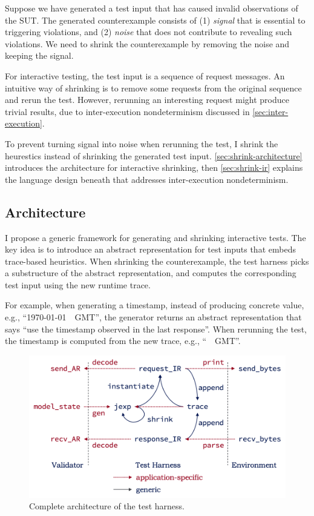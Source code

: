 Suppose we have generated a test input that has caused invalid observations of
the SUT.  The generated counterexample consists of (1) {\em signal} that is
essential to triggering violations, and (2) {\em noise} that does not contribute
to revealing such violations.  We need to shrink the counterexample by removing
the noise and keeping the signal.

For interactive testing, the test input is a sequence of request messages.  An
intuitive way of shrinking is to remove some requests from the original sequence
and rerun the test.  However, rerunning an interesting request might produce
trivial results, due to inter-execution nondeterminism discussed in
\autoref{sec:inter-execution}.

To prevent turning signal into noise when rerunning the test, I shrink the
heurestics instead of shrinking the generated test input.
\autoref{sec:shrink-architecture} introduces the architecture for interactive
shrinking, then \autoref{sec:shrink-ir} explains the language design beneath
that addresses inter-execution nondeterminism.

\subsection{Architecture}
\label{sec:shrink-architecture}

I propose a generic framework for generating and shrinking interactive tests.
The key idea is to introduce an abstract representation for test inputs that
embeds trace-based heuristics.  When shrinking the counterexample, the test
harness picks a substructure of the abstract representation, and computes the
corresponding test input using the new runtime trace.

For example, when generating a timestamp, instead of producing concrete value,
e.g., ``\httpdate\today~\currenttime~GMT'', the generator returns an abstract
representation that says ``use the timestamp observed in the last response''.
When rerunning the test, the timestamp is computed from the new trace, e.g.,
``\httpdate\DayAfter~\currenttime~GMT''.

\begin{figure}
  \includegraphics[width=.8\textwidth]{figures/shrink}
  \caption{Complete architecture of the test harness.}
  \label{fig:shrink}
\end{figure}

